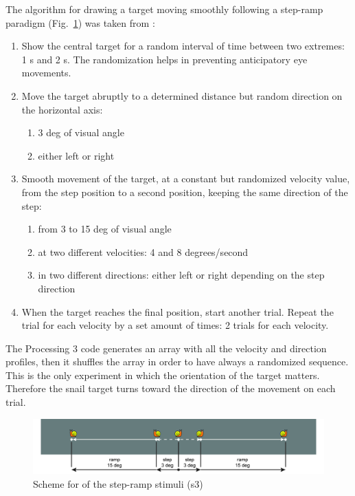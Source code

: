 The algorithm for drawing a target moving smoothly following a step-ramp paradigm (Fig.~\ref{fig:steprampscreens}) was taken from \cite{takarae2004smoothpursuit}:
\begin{enumerate}
    \item Show the central target for a random interval of time between two extremes: 1 s and 2 s. The randomization helps in preventing anticipatory eye movements.
    \item Move the target abruptly to a determined distance but random direction on the horizontal axis:
    \begin{enumerate}[label*=\arabic*.]
        \item 3 deg of visual angle
        \item either left or right
    \end{enumerate}
    \item Smooth movement of the target, at a constant but randomized velocity value, from the step position to a second position, keeping the same direction of the step:
    \begin{enumerate}[label*=\arabic*.]
        \item from 3 to 15 deg of visual angle
        \item at two different velocities: 4 and 8 degrees/second
        \item in two different directions: either left or right depending on the step direction
    \end{enumerate}
    \item When the target reaches the final position, start another trial. Repeat the trial for each velocity by a set amount of times: 2 trials for each velocity.
\end{enumerate}

The Processing 3 code generates an array with all the velocity and direction profiles, then it shuffles the array in order to have always a randomized sequence. This is the only experiment in which the orientation of the target matters. Therefore the snail target turns toward the direction of the movement on each trial.

\begin{figure}[h]
  \centering
  \includegraphics[width=.9\textwidth]{figures/stimulitarget-11.jpg}
  \caption[Step-ramp stimuli screenshots]{Scheme for of the step-ramp stimuli (s3)}
  \label{fig:steprampscreens}
\end{figure}



